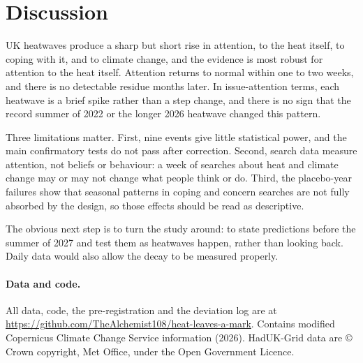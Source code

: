 \documentclass[11pt,a4paper]{article}
\begin{document}
\section{Discussion}

UK heatwaves produce a sharp but short rise in attention, to the heat itself, to coping with it, and to climate change, and the evidence is most robust for attention to the heat itself. Attention returns to normal within one to two weeks, and there is no detectable residue months later. In issue-attention terms, each heatwave is a brief spike rather than a step change, and there is no sign that the record summer of 2022 or the longer 2026 heatwave changed this pattern.

Three limitations matter. First, nine events give little statistical power, and the main confirmatory tests do not pass after correction. Second, search data measure attention, not beliefs or behaviour: a week of searches about heat and climate change may or may not change what people think or do. Third, the placebo-year failures show that seasonal patterns in coping and concern searches are not fully absorbed by the design, so those effects should be read as descriptive.

The obvious next step is to turn the study around: to state predictions before the summer of 2027 and test them as heatwaves happen, rather than looking back. Daily data would also allow the decay to be measured properly.

\paragraph{Data and code.} All data, code, the pre-registration and the deviation log are at \url{https://github.com/TheAlchemist108/heat-leaves-a-mark}. Contains modified Copernicus Climate Change Service information (2026). HadUK-Grid data are \copyright{} Crown copyright, Met Office, under the Open Government Licence.
\end{document}
